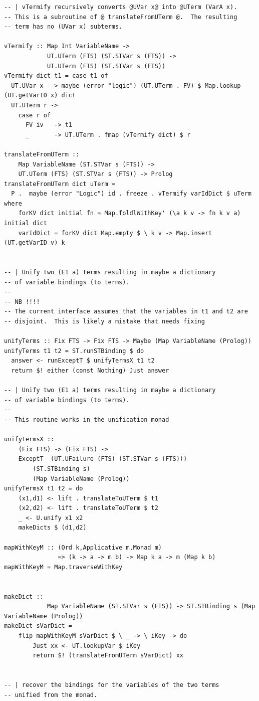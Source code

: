 \documentclass[thesis-solanki.tex]{subfiles}
\begin{document}
\begin{verbatim}
-- | vTermify recursively converts @UVar x@ into @UTerm (VarA x).
-- This is a subroutine of @ translateFromUTerm @.  The resulting
-- term has no (UVar x) subterms.

vTermify :: Map Int VariableName ->
            UT.UTerm (FTS) (ST.STVar s (FTS)) ->
            UT.UTerm (FTS) (ST.STVar s (FTS))
vTermify dict t1 = case t1 of
  UT.UVar x  -> maybe (error "logic") (UT.UTerm . FV) $ Map.lookup (UT.getVarID x) dict
  UT.UTerm r ->
    case r of
      FV iv   -> t1
      _       -> UT.UTerm . fmap (vTermify dict) $ r

translateFromUTerm ::
    Map VariableName (ST.STVar s (FTS)) ->
    UT.UTerm (FTS) (ST.STVar s (FTS)) -> Prolog
translateFromUTerm dict uTerm =
  P .  maybe (error "Logic") id . freeze . vTermify varIdDict $ uTerm where
    forKV dict initial fn = Map.foldlWithKey' (\a k v -> fn k v a) initial dict
    varIdDict = forKV dict Map.empty $ \ k v -> Map.insert (UT.getVarID v) k


-- | Unify two (E1 a) terms resulting in maybe a dictionary
-- of variable bindings (to terms).
--
-- NB !!!!
-- The current interface assumes that the variables in t1 and t2 are
-- disjoint.  This is likely a mistake that needs fixing

unifyTerms :: Fix FTS -> Fix FTS -> Maybe (Map VariableName (Prolog))
unifyTerms t1 t2 = ST.runSTBinding $ do
  answer <- runExceptT $ unifyTermsX t1 t2
  return $! either (const Nothing) Just answer

-- | Unify two (E1 a) terms resulting in maybe a dictionary
-- of variable bindings (to terms).
--
-- This routine works in the unification monad

unifyTermsX ::
    (Fix FTS) -> (Fix FTS) ->
    ExceptT  (UT.UFailure (FTS) (ST.STVar s (FTS)))
        (ST.STBinding s)
        (Map VariableName (Prolog))
unifyTermsX t1 t2 = do
    (x1,d1) <- lift . translateToUTerm $ t1
    (x2,d2) <- lift . translateToUTerm $ t2
    _ <- U.unify x1 x2
    makeDicts $ (d1,d2)

mapWithKeyM :: (Ord k,Applicative m,Monad m)
               => (k -> a -> m b) -> Map k a -> m (Map k b)
mapWithKeyM = Map.traverseWithKey


makeDict ::
            Map VariableName (ST.STVar s (FTS)) -> ST.STBinding s (Map VariableName (Prolog))
makeDict sVarDict =
    flip mapWithKeyM sVarDict $ \ _ -> \ iKey -> do
        Just xx <- UT.lookupVar $ iKey
        return $! (translateFromUTerm sVarDict) xx


-- | recover the bindings for the variables of the two terms
-- unified from the monad.


\end{verbatim}
\end{document}
